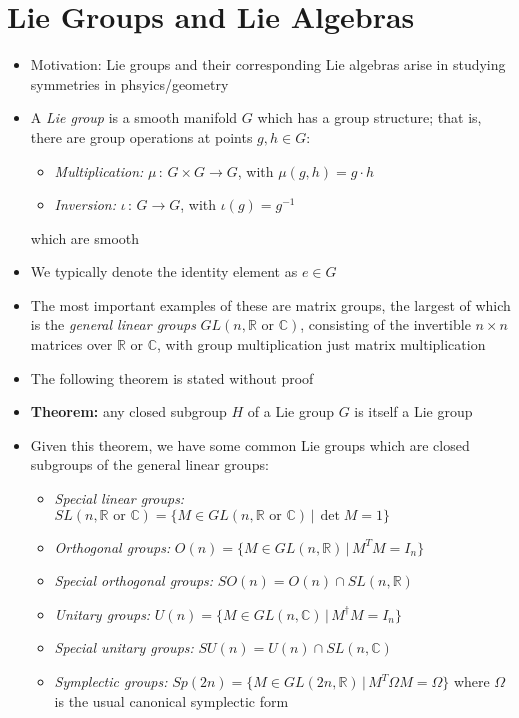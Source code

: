 \documentclass[12pt,a4paper]{article}
\numberwithin{equation}{section}
\begin{document}
	\section{Lie Groups and Lie Algebras}
	\begin{itemize}
		\item Motivation: Lie groups and their corresponding Lie algebras arise in studying symmetries in phsyics/geometry
		\item A \textit{Lie group} is a smooth manifold $G$ which has a group structure; that is, there are group operations at points $g,h\in G$:
		\begin{itemize}
			\item \textit{Multiplication:} $\mu\,:\,G\times G \to G$, with $\mu(g,h)=g\cdot h$
			\item \textit{Inversion:} $\iota\,:\,G\to G$, with $\iota(g)=g^{-1}$
		\end{itemize}
		which are smooth
		\item We typically denote the identity element as $e\in G$
		\item The most important examples of these are matrix groups, the largest of which is the \textit{general linear groups} $GL(n,\mathbb{R}\text{ or }\mathbb{C})$, consisting of the invertible $n\times n$ matrices over $\mathbb{R}$ or $\mathbb{C}$, with group multiplication just matrix multiplication
		\item The following theorem is stated without proof
		\item \textbf{Theorem:} any closed subgroup $H$ of a Lie group $G$ is itself a Lie group
		\item Given this theorem, we have some common Lie groups which are closed subgroups of the general linear groups:
		\begin{itemize}
			\item \textit{Special linear groups:} $SL(n,\mathbb{R}\text{ or }\mathbb{C})=\{M\in GL(n,\mathbb{R}\text{ or }\mathbb{C})\,|\,\det{M}=1\}$
			\item \textit{Orthogonal groups:} $O(n)=\{M\in GL(n,\mathbb{R})\,|\, M^{T}M=I_{n}\}$
			\item \textit{Special orthogonal groups:} $SO(n)=O(n)\cap SL(n,\mathbb{R})$ 
			\item \textit{Unitary groups:} $U(n)=\{M\in GL(n,\mathbb{C})\,|\,M^{\dagger}M=I_{n}\}$
			\item \textit{Special unitary groups:} $SU(n)=U(n)\cap SL(n,\mathbb{C})$
			\item \textit{Symplectic groups:} $Sp(2n)=\{M\in GL(2n,\mathbb{R})\,|\, M^{T}\Omega M=\Omega\}$ where $\Omega$ is the usual canonical symplectic form

\end{itemize}
\end{itemize}
\end{document}
